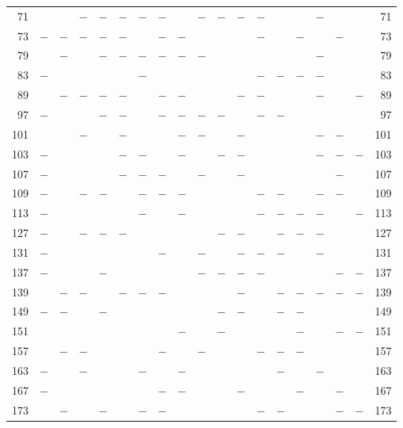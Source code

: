 \begin{center}
\begin{tabular}{r|c|c|c|c|c|c|c|c|c|c|c|c|c|c|c|c|c|r}
71 &  &  & $-$ & $-$ & $-$ & $-$ & $-$ &  & $-$ & $-$ & $-$ & $-$ &  &  & $-$ &  &  & 71\\
73 & $-$ & $-$ & $-$ & $-$ & $-$ &  & $-$ & $-$ &  &  &  & $-$ &  & $-$ &  & $-$ &  & 73\\
79 &  & $-$ &  & $-$ & $-$ & $-$ & $-$ & $-$ & $-$ &  &  &  &  &  & $-$ &  &  & 79\\
83 & $-$ &  &  &  &  & $-$ &  &  &  &  &  & $-$ & $-$ & $-$ & $-$ &  &  & 83\\
89 &  & $-$ & $-$ & $-$ & $-$ &  & $-$ & $-$ &  &  & $-$ & $-$ &  &  & $-$ &  & $-$ & 89\\
97 & $-$ &  &  & $-$ & $-$ &  & $-$ & $-$ & $-$ & $-$ &  & $-$ & $-$ &  &  &  &  & 97\\
101 &  &  & $-$ &  & $-$ &  &  & $-$ & $-$ &  & $-$ &  &  &  & $-$ & $-$ &  & 101\\
103 & $-$ &  &  &  & $-$ & $-$ &  & $-$ &  & $-$ & $-$ &  &  &  & $-$ & $-$ & $-$ & 103\\
107 & $-$ &  &  &  & $-$ & $-$ & $-$ &  & $-$ &  & $-$ &  &  &  &  & $-$ &  & 107\\
109 & $-$ &  & $-$ & $-$ &  & $-$ & $-$ & $-$ &  &  &  & $-$ & $-$ &  & $-$ & $-$ &  & 109\\
113 & $-$ &  &  &  &  & $-$ &  & $-$ &  &  &  & $-$ & $-$ & $-$ & $-$ &  & $-$ & 113\\
127 & $-$ &  & $-$ & $-$ & $-$ &  &  &  &  & $-$ & $-$ &  & $-$ & $-$ & $-$ &  &  & 127\\
131 & $-$ &  &  &  &  &  & $-$ &  & $-$ &  & $-$ & $-$ & $-$ &  & $-$ &  &  & 131\\
137 & $-$ &  &  & $-$ &  &  &  &  & $-$ & $-$ & $-$ & $-$ &  &  &  & $-$ & $-$ & 137\\
139 &  & $-$ & $-$ &  & $-$ & $-$ & $-$ &  &  &  & $-$ &  & $-$ & $-$ & $-$ & $-$ & $-$ & 139\\
149 & $-$ & $-$ &  & $-$ &  &  &  &  &  & $-$ & $-$ &  & $-$ & $-$ &  &  &  & 149\\
151 &  &  &  &  &  &  &  & $-$ &  & $-$ &  &  &  & $-$ &  & $-$ & $-$ & 151\\
157 &  & $-$ & $-$ &  &  &  & $-$ &  & $-$ &  &  & $-$ & $-$ & $-$ &  &  &  & 157\\
163 & $-$ &  & $-$ &  &  & $-$ &  & $-$ &  &  &  &  & $-$ &  & $-$ &  &  & 163\\
167 & $-$ &  &  &  &  &  & $-$ & $-$ &  &  & $-$ &  &  & $-$ &  & $-$ &  & 167\\
173 &  & $-$ &  & $-$ &  & $-$ & $-$ &  &  &  &  & $-$ & $-$ &  &  & $-$ & $-$ & 173\\

\end{tabular}
\end{center}

